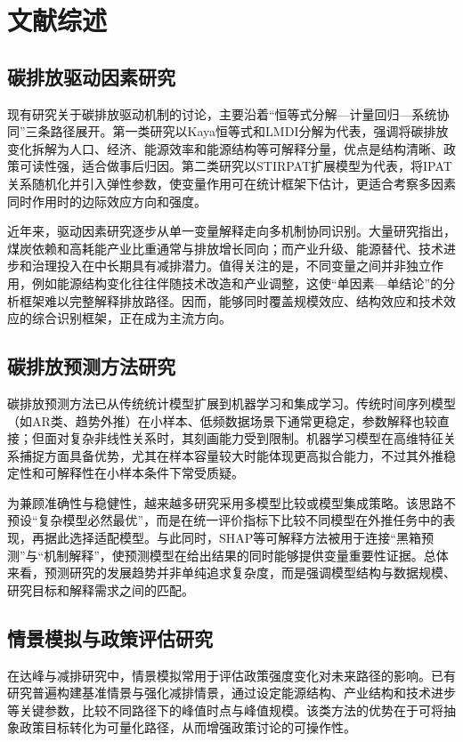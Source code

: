 \section{文献综述}
\subsection{碳排放驱动因素研究}
现有研究关于碳排放驱动机制的讨论，主要沿着“恒等式分解—计量回归—系统协同”三条路径展开。第一类研究以Kaya恒等式和LMDI分解为代表，强调将碳排放变化拆解为人口、经济、能源效率和能源结构等可解释分量，优点是结构清晰、政策可读性强，适合做事后归因。第二类研究以STIRPAT扩展模型为代表，将IPAT关系随机化并引入弹性参数，使变量作用可在统计框架下估计，更适合考察多因素同时作用时的边际效应方向和强度。

近年来，驱动因素研究逐步从单一变量解释走向多机制协同识别。大量研究指出，煤炭依赖和高耗能产业比重通常与排放增长同向；而产业升级、能源替代、技术进步和治理投入在中长期具有减排潜力。值得关注的是，不同变量之间并非独立作用，例如能源结构变化往往伴随技术改造和产业调整，这使“单因素—单结论”的分析框架难以完整解释排放路径。因而，能够同时覆盖规模效应、结构效应和技术效应的综合识别框架，正在成为主流方向。

\subsection{碳排放预测方法研究}
碳排放预测方法已从传统统计模型扩展到机器学习和集成学习。传统时间序列模型（如AR类、趋势外推）在小样本、低频数据场景下通常更稳定，参数解释也较直接；但面对复杂非线性关系时，其刻画能力受到限制。机器学习模型在高维特征关系捕捉方面具备优势，尤其在样本容量较大时能体现更高拟合能力，不过其外推稳定性和可解释性在小样本条件下常受质疑。

为兼顾准确性与稳健性，越来越多研究采用多模型比较或模型集成策略。该思路不预设“复杂模型必然最优”，而是在统一评价指标下比较不同模型在外推任务中的表现，再据此选择适配模型。与此同时，SHAP等可解释方法被用于连接“黑箱预测”与“机制解释”，使预测模型在给出结果的同时能够提供变量重要性证据。总体来看，预测研究的发展趋势并非单纯追求复杂度，而是强调模型结构与数据规模、研究目标和解释需求之间的匹配。

\subsection{情景模拟与政策评估研究}
在达峰与减排研究中，情景模拟常用于评估政策强度变化对未来路径的影响。已有研究普遍构建基准情景与强化减排情景，通过设定能源结构、产业结构和技术进步等关键参数，比较不同路径下的峰值时点与峰值规模。该类方法的优势在于可将抽象政策目标转化为可量化路径，从而增强政策讨论的可操作性。

